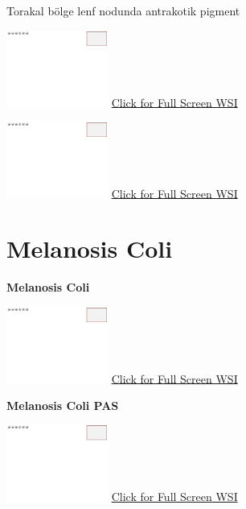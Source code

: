 \documentclass[
  letterpaper,
  paper=6in:9in,
  pagesize=pdftex,
  headinclude=on,
  footinclude=on,
  12pt]{scrbook}
\begin{document}
Torakal bölge lenf nodunda antrakotik pigment

\href{https://images.patolojiatlasi.com/template/HE.html}{\includegraphics[width=0.25\textwidth,height=\textheight]{./screenshots/template_screenshot.png}}
\href{https://images.patolojiatlasi.com/anthracosis/HE.html}{Click for
Full Screen WSI}

\href{https://images.patolojiatlasi.com/template/HE.html}{\includegraphics[width=0.25\textwidth,height=\textheight]{./screenshots/template_screenshot.png}}
\href{https://images.patolojiatlasi.com/anthracosis/HE2.html}{Click for
Full Screen WSI}

\hypertarget{sec-melanosis-coli}{%
\section{Melanosis Coli}\label{sec-melanosis-coli}}

\textbf{Melanosis Coli}

\href{https://images.patolojiatlasi.com/template/HE.html}{\includegraphics[width=0.25\textwidth,height=\textheight]{./screenshots/template_screenshot.png}}
\href{https://images.patolojiatlasi.com/melanosiscoli/HE.html}{Click for
Full Screen WSI}

\textbf{Melanosis Coli PAS}

\href{https://images.patolojiatlasi.com/template/HE.html}{\includegraphics[width=0.25\textwidth,height=\textheight]{./screenshots/template_screenshot.png}}
\href{https://images.patolojiatlasi.com/melanosiscoli/PAS.html}{Click
for Full Screen WSI}
\end{document}
